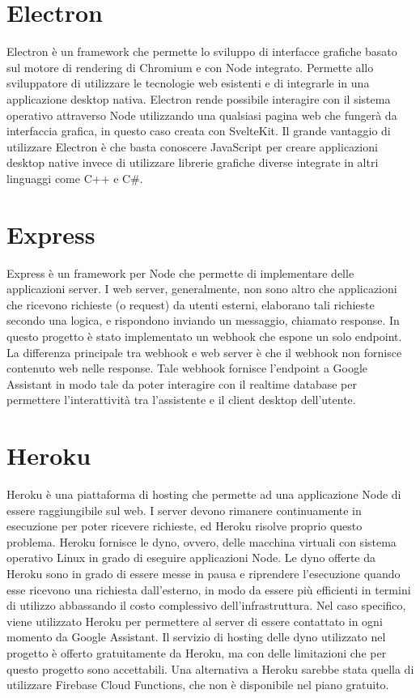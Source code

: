 \section{Electron}
Electron è un framework che permette lo sviluppo di interfacce grafiche basato sul motore di rendering di Chromium e con Node integrato.
Permette allo sviluppatore di utilizzare le tecnologie web esistenti e di integrarle in una applicazione desktop nativa.
Electron rende possibile interagire con il sistema operativo attraverso Node utilizzando una qualsiasi pagina web che fungerà da interfaccia grafica, in questo caso creata con SvelteKit.
Il grande vantaggio di utilizzare Electron è che basta conoscere JavaScript per creare applicazioni desktop native invece di utilizzare librerie grafiche diverse integrate in altri linguaggi come C++ e C\#.

\section{Express}
Express è un framework per Node che permette di implementare delle applicazioni server.
I web server, generalmente, non sono altro che applicazioni che ricevono richieste (o request) da utenti esterni, elaborano tali richieste secondo una logica, e rispondono inviando un messaggio, chiamato response.
In questo progetto è stato implementato un webhook che espone un solo endpoint.
La differenza principale tra webhook e web server è che il webhook non fornisce contenuto web nelle response.
Tale webhook fornisce l'endpoint a Google Assistant in modo tale da poter interagire con il realtime database per permettere l'interattività tra l'assistente e il client desktop dell’utente.

\section{Heroku}
Heroku è una piattaforma di hosting che permette ad una applicazione Node di essere raggiungibile sul web.
I server devono rimanere continuamente in esecuzione per poter ricevere richieste, ed Heroku risolve proprio questo problema.
Heroku fornisce le dyno, ovvero, delle macchina virtuali con sistema operativo Linux in grado di eseguire applicazioni Node.
Le dyno offerte da Heroku sono in grado di essere messe in pausa e riprendere l'esecuzione quando esse ricevono una richiesta dall'esterno, in modo da essere più efficienti in termini di utilizzo abbassando il costo complessivo dell'infrastruttura.
Nel caso specifico, viene utilizzato Heroku per permettere al server di essere contattato in ogni momento da Google Assistant.
Il servizio di hosting delle dyno utilizzato nel progetto è offerto gratuitamente da Heroku, ma con delle limitazioni che per questo progetto sono accettabili.
Una alternativa a Heroku sarebbe stata quella di utilizzare Firebase Cloud Functions, che non è disponibile nel piano gratuito.


